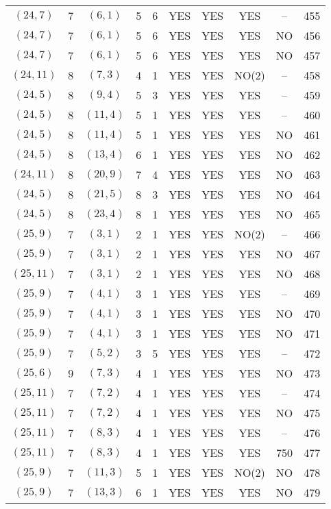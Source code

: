 \begin{longtable}{|c|c|c|c|c|c|c|c|c|c|}
$(24, 7)$ & 7 & $(6, 1)$ & 5 & 6 & YES & YES & YES & -- & 455\\
$(24, 7)$ & 7 & $(6, 1)$ & 5 & 6 & YES & YES & YES & NO & 456\\
$(24, 7)$ & 7 & $(6, 1)$ & 5 & 6 & YES & YES & YES & NO & 457\\
$(24, 11)$ & 8 & $(7, 3)$ & 4 & 1 & YES & YES & NO(2) & -- & 458\\
$(24, 5)$ & 8 & $(9, 4)$ & 5 & 3 & YES & YES & YES & -- & 459\\
$(24, 5)$ & 8 & $(11, 4)$ & 5 & 1 & YES & YES & YES & -- & 460\\
$(24, 5)$ & 8 & $(11, 4)$ & 5 & 1 & YES & YES & YES & NO & 461\\
$(24, 5)$ & 8 & $(13, 4)$ & 6 & 1 & YES & YES & YES & NO & 462\\
$(24, 11)$ & 8 & $(20, 9)$ & 7 & 4 & YES & YES & YES & NO & 463\\
$(24, 5)$ & 8 & $(21, 5)$ & 8 & 3 & YES & YES & YES & NO & 464\\
$(24, 5)$ & 8 & $(23, 4)$ & 8 & 1 & YES & YES & YES & NO & 465\\
$(25, 9)$ & 7 & $(3, 1)$ & 2 & 1 & YES & YES & NO(2) & -- & 466\\
$(25, 9)$ & 7 & $(3, 1)$ & 2 & 1 & YES & YES & YES & NO & 467\\
$(25, 11)$ & 7 & $(3, 1)$ & 2 & 1 & YES & YES & YES & NO & 468\\
$(25, 9)$ & 7 & $(4, 1)$ & 3 & 1 & YES & YES & YES & -- & 469\\
$(25, 9)$ & 7 & $(4, 1)$ & 3 & 1 & YES & YES & YES & NO & 470\\
$(25, 9)$ & 7 & $(4, 1)$ & 3 & 1 & YES & YES & YES & NO & 471\\
$(25, 9)$ & 7 & $(5, 2)$ & 3 & 5 & YES & YES & YES & -- & 472\\
$(25, 6)$ & 9 & $(7, 3)$ & 4 & 1 & YES & YES & YES & NO & 473\\
$(25, 11)$ & 7 & $(7, 2)$ & 4 & 1 & YES & YES & YES & -- & 474\\
$(25, 11)$ & 7 & $(7, 2)$ & 4 & 1 & YES & YES & YES & NO & 475\\
$(25, 11)$ & 7 & $(8, 3)$ & 4 & 1 & YES & YES & YES & -- & 476\\
$(25, 11)$ & 7 & $(8, 3)$ & 4 & 1 & YES & YES & YES & 750 & 477\\
$(25, 9)$ & 7 & $(11, 3)$ & 5 & 1 & YES & YES & NO(2) & NO & 478\\
$(25, 9)$ & 7 & $(13, 3)$ & 6 & 1 & YES & YES & YES & NO & 479\\

\end{longtable}
